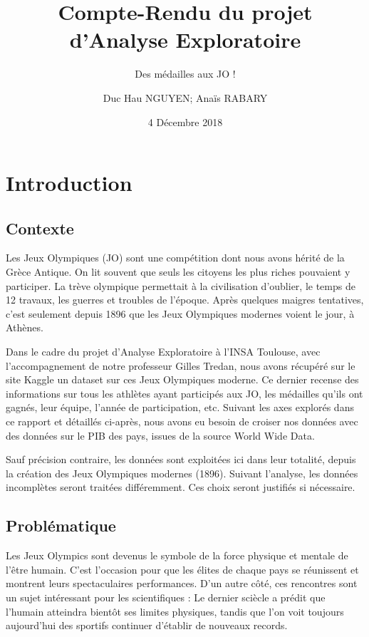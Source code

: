 \documentclass[11pt,]{article}
\title{Compte-Rendu du projet d'Analyse Exploratoire}
\subtitle{Des médailles aux JO !}
\author{Duc Hau NGUYEN; Anaïs RABARY}
\date{4 Décembre 2018}
\begin{document}
\maketitle

{
\setcounter{tocdepth}{3}
\tableofcontents
}
\newpage

\section{Introduction}\label{introduction}

\subsection{Contexte}\label{contexte}

Les Jeux Olympiques (JO) sont une compétition dont nous avons hérité de
la Grèce Antique. On lit souvent que seuls les citoyens les plus riches
pouvaient y participer. La trève olympique permettait à la civilisation
d'oublier, le temps de 12 travaux, les guerres et troubles de l'époque.
Après quelques maigres tentatives, c'est seulement depuis 1896 que les
Jeux Olympiques modernes voient le jour, à Athènes.

Dans le cadre du projet d'Analyse Exploratoire à l'INSA Toulouse, avec
l'accompagnement de notre professeur Gilles Tredan, nous avons récupéré
sur le site Kaggle un dataset sur ces Jeux Olympiques moderne. Ce
dernier recense des informations sur tous les athlètes ayant participés
aux JO, les médailles qu'ils ont gagnés, leur équipe, l'année de
participation, etc. Suivant les axes explorés dans ce rapport et
détaillés ci-après, nous avons eu besoin de croiser nos données avec des
données sur le PIB des pays, issues de la source World Wide Data.

Sauf précision contraire, les données sont exploitées ici dans leur
totalité, depuis la création des Jeux Olympiques modernes (1896).
Suivant l'analyse, les données incomplètes seront traitées différemment.
Ces choix seront justifiés si nécessaire.

\subsection{Problématique}\label{problematique}

Les Jeux Olympics sont devenus le symbole de la force physique et
mentale de l'être humain. C'est l'occasion pour que les élites de chaque
pays se réunissent et montrent leurs spectaculaires performances. D'un
autre côté, ces rencontres sont un sujet intéressant pour les
scientifiques : Le dernier sciècle a prédit que l'humain atteindra
bientôt ses limites physiques, tandis que l'on voit toujours aujourd'hui
des sportifs continuer d'établir de nouveaux records.
\end{document}

